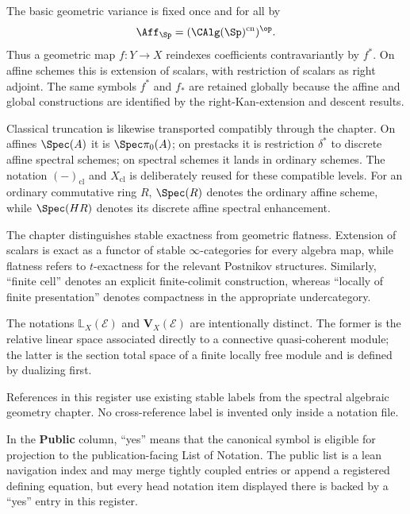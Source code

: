 The basic geometric variance is fixed once and for all by
\[
  \Aff_{\Sp}=(\CAlg(\Sp)^{\mathrm{cn}})^{\op}.
\]
Thus a geometric map $f:Y\to X$ reindexes coefficients contravariantly by $f^*$.
On affine schemes this is extension of scalars, with restriction of scalars as right
adjoint.  The same symbols $f^*$ and $f_*$ are retained globally because the affine and
global constructions are identified by the right-Kan-extension and descent results.

Classical truncation is likewise transported compatibly through the chapter.  On affines
$\Spec(A)$ it is $\Spec\pi_0(A)$; on prestacks it is restriction $\delta^*$ to discrete affine
spectral schemes; on spectral schemes it lands in ordinary schemes.  The notation
$(-)_{\mathrm{cl}}$ and $X_{\mathrm{cl}}$ is deliberately reused for these compatible
levels.  For an ordinary commutative ring $R$, $\Spec(R)$ denotes the ordinary affine scheme,
while $\Spec(HR)$ denotes its discrete affine spectral enhancement.

The chapter distinguishes stable exactness from geometric flatness.  Extension of scalars
is exact as a functor of stable $\infty$-categories for every algebra map, while flatness
refers to $t$-exactness for the relevant Postnikov structures.  Similarly, ``finite cell''
denotes an explicit finite-colimit construction, whereas ``locally of finite presentation''
denotes compactness in the appropriate undercategory.

The notations $\mathbb L_X(\mathcal E)$ and $\mathbf V_X(\mathcal E)$ are intentionally
distinct.  The former is the relative linear space associated directly to a connective
quasi-coherent module; the latter is the section total space of a finite locally free
module and is defined by dualizing first.

References in this register use existing stable labels from the spectral algebraic geometry
chapter.  No cross-reference label is invented only inside a notation file.

In the \textbf{Public} column, ``yes'' means that the canonical symbol is eligible for
projection to the publication-facing List of Notation.  The public list is a lean navigation
index and may merge tightly coupled entries or append a registered defining equation, but
every head notation item displayed there is backed by a ``yes'' entry in this register.


